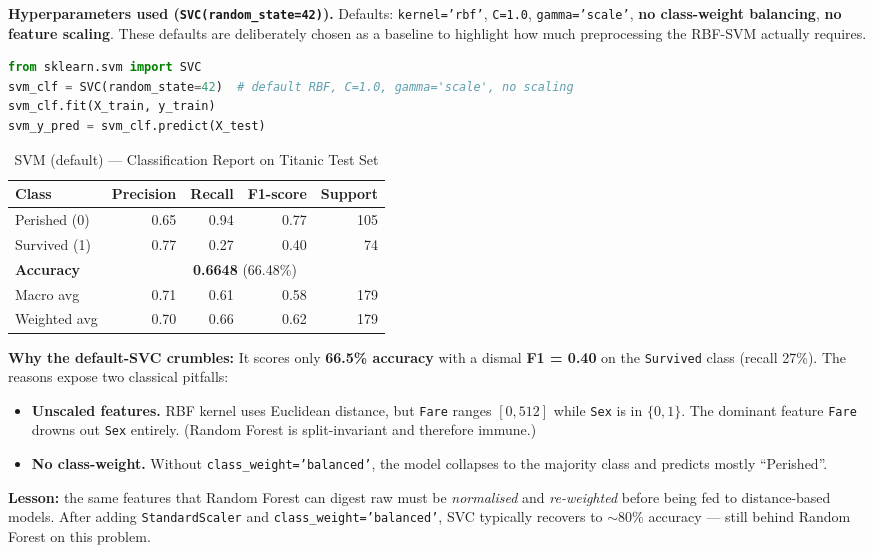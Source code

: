 \textbf{Hyperparameters used (\texttt{SVC(random\_state=42)}).} Defaults: \texttt{kernel='rbf'}, \texttt{C=1.0}, \texttt{gamma='scale'}, \textbf{no class-weight balancing}, \textbf{no feature scaling}. These defaults are deliberately chosen as a baseline to highlight how much preprocessing the RBF-SVM actually requires.

\begin{lstlisting}[language=Python,caption={SVM training with default settings (serves as a cautionary baseline).}]
from sklearn.svm import SVC
svm_clf = SVC(random_state=42)  # default RBF, C=1.0, gamma='scale', no scaling
svm_clf.fit(X_train, y_train)
svm_y_pred = svm_clf.predict(X_test)
\end{lstlisting}

\begin{table}[H]
\centering
\caption{SVM (default) --- Classification Report on Titanic Test Set}
\label{tab:a2_svm_report}
\begin{tabular}{lrrrr}
\hline
\textbf{Class} & \textbf{Precision} & \textbf{Recall} & \textbf{F1-score} & \textbf{Support} \\
\hline
Perished (0) & 0.65 & 0.94 & 0.77 & 105 \\
Survived (1) & 0.77 & 0.27 & 0.40 & 74 \\
\hline
\textbf{Accuracy}   & \multicolumn{4}{c}{\textbf{0.6648} (66.48\%)} \\
Macro avg    & 0.71 & 0.61 & 0.58 & 179 \\
Weighted avg & 0.70 & 0.66 & 0.62 & 179 \\
\hline
\end{tabular}
\end{table}

\begin{importantbox}
\textbf{Why the default-SVC crumbles:} It scores only \textbf{66.5\% accuracy} with a dismal \textbf{F1 = 0.40} on the \texttt{Survived} class (recall 27\%). The reasons expose two classical pitfalls:
\begin{itemize}
    \item \textbf{Unscaled features.} RBF kernel uses Euclidean distance, but \texttt{Fare} ranges $[0, 512]$ while \texttt{Sex} is in $\{0, 1\}$. The dominant feature \texttt{Fare} drowns out \texttt{Sex} entirely. (Random Forest is split-invariant and therefore immune.)
    \item \textbf{No class-weight.} Without \texttt{class\_weight='balanced'}, the model collapses to the majority class and predicts mostly ``Perished''.
\end{itemize}
\textbf{Lesson:} the same features that Random Forest can digest raw must be \emph{normalised} and \emph{re-weighted} before being fed to distance-based models. After adding \texttt{StandardScaler} and \texttt{class\_weight='balanced'}, SVC typically recovers to $\sim$80\% accuracy --- still behind Random Forest on this problem.
\end{importantbox}

